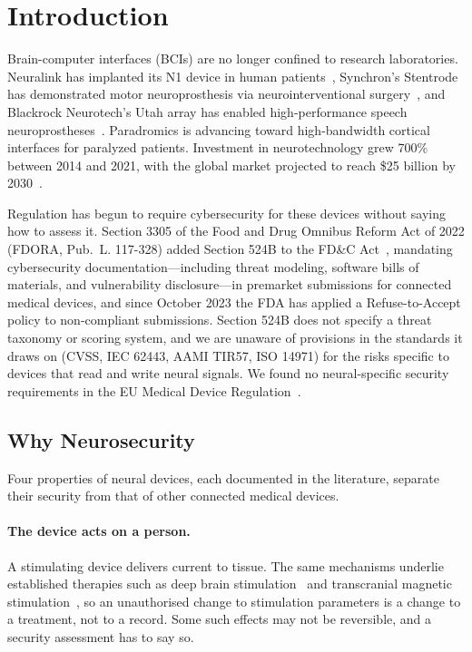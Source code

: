 
\section{Introduction}
\label{sec:introduction}

Brain-computer interfaces (BCIs) are no longer confined to research laboratories.
Neuralink has implanted its N1 device in human patients~\cite{musk2019neuralink},
Synchron's Stentrode has demonstrated motor neuroprosthesis via neurointerventional
surgery~\cite{oxley2021stentrode}, and Blackrock Neurotech's Utah array has enabled
high-performance speech neuroprostheses~\cite{willett2023speech}. Paradromics is
advancing toward high-bandwidth cortical interfaces for paralyzed patients.
Investment in neurotechnology grew 700\% between 2014 and 2021, with the global
market projected to reach \$25 billion by 2030~\cite{unesco2025recommendation}.

Regulation has begun to require cybersecurity for these devices without saying how to
assess it. Section 3305 of the Food and Drug Omnibus Reform Act of 2022
(FDORA, Pub.~L. 117-328) added Section 524B to the FD\&C Act~\cite{fda524b},
mandating cybersecurity documentation---including threat modeling, software bills
of materials, and vulnerability disclosure---in premarket submissions for
connected medical devices, and since October 2023 the FDA has applied a
Refuse-to-Accept policy to non-compliant submissions. Section 524B does not specify
a threat taxonomy or scoring system, and we are unaware of provisions in the standards
it draws on (CVSS, IEC 62443, AAMI TIR57, ISO 14971) for the risks specific to devices
that read and write neural signals. We found no neural-specific security requirements in
the EU Medical Device Regulation~\cite{eumdr2017}.

\subsection{Why Neurosecurity}
\label{sec:why-neurosecurity}

Four properties of neural devices, each documented in the literature, separate their
security from that of other connected medical devices.

\paragraph{The device acts on a person.}
A stimulating device delivers current to tissue. The same mechanisms underlie established
therapies such as deep brain stimulation~\cite{lozano2019dbs} and transcranial magnetic
stimulation~\cite{hallett2007tms}, so an unauthorised change to stimulation parameters is a
change to a treatment, not to a record. Some such effects may not be reversible, and a
security assessment has to say so.

